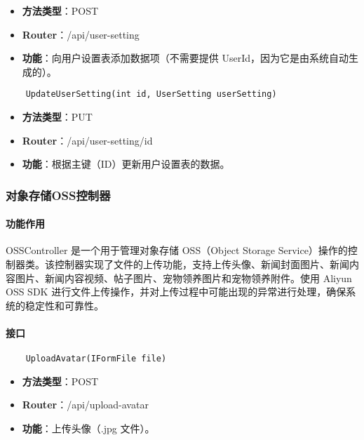 \begin{itemize}
	\item \textbf{方法类型}：POST
	\item \textbf{Router}：/api/user-setting
	\item \textbf{功能}：向用户设置表添加数据项（不需要提供 UserId，因为它是由系统自动生成的）。
\end{itemize}

\begin{verbatim}
	UpdateUserSetting(int id, UserSetting userSetting)
\end{verbatim}

\begin{itemize}
	\item \textbf{方法类型}：PUT
	\item \textbf{Router}：/api/user-setting/{id}
	\item \textbf{功能}：根据主键（ID）更新用户设置表的数据。
\end{itemize}

\subsubsection{对象存储OSS控制器}

\paragraph{功能作用}

OSSController 是一个用于管理对象存储 OSS（Object Storage Service）操作的控制器类。该控制器实现了文件的上传功能，支持上传头像、新闻封面图片、新闻内容图片、新闻内容视频、帖子图片、宠物领养图片和宠物领养附件。使用 Aliyun OSS SDK 进行文件上传操作，并对上传过程中可能出现的异常进行处理，确保系统的稳定性和可靠性。

\paragraph{接口}

\begin{verbatim}
	UploadAvatar(IFormFile file)
\end{verbatim}

\begin{itemize}
	\item \textbf{方法类型}：POST
	\item \textbf{Router}：/api/upload-avatar
	\item \textbf{功能}：上传头像（.jpg 文件）。
\end{itemize}

